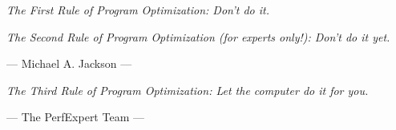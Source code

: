 \documentclass[11pt,a4paper,oneside]{book}
\begin{document}
\pagestyle{empty}



\glsaddall
\printglossaries

\cleardoublepage
{}
\printindex

\tableofcontents



\emph{The First Rule of Program Optimization: Don't do it.}

\emph{The Second Rule of Program Optimization (for experts only!): Don't do it yet.}

  ---  Michael A. Jackson ---

\emph{The Third Rule of Program Optimization: Let the computer do it for you.}

--- The PerfExpert Team ---






\appendix


\end{document}
